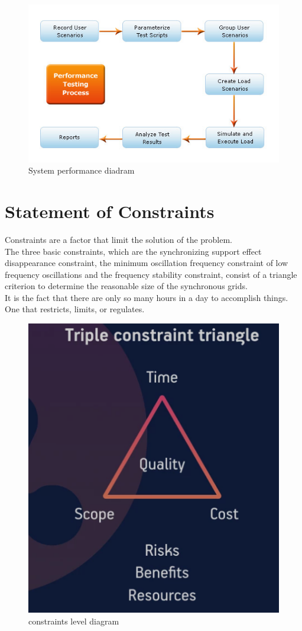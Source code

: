 \documentclass[a4paper,12pt]{report}
\begin{document}
\begin{figure}[h]
	\centering
	\includegraphics[width=0.7\linewidth]{Performance-Testing-Process}
	\caption{System performance diadram}
	\label{fig:performance-testing-process}
\end{figure}
\section{Statement of Constraints}
Constraints are a factor that limit the solution of the problem.\\
The three basic constraints, which are the synchronizing support effect disappearance constraint, the minimum oscillation frequency constraint of low frequency oscillations and the frequency stability constraint, consist of a triangle criterion to determine the reasonable size of the synchronous grids.\\
It is the fact that there are only so many hours in a day to accomplish things. One that restricts, limits, or regulates.\\	
\begin{figure}[h]
	\centering
	\includegraphics[width=0.6\linewidth]{7_1}
	\caption{constraints level diagram}
	\label{fig:71}
\end{figure}
\end{document}
